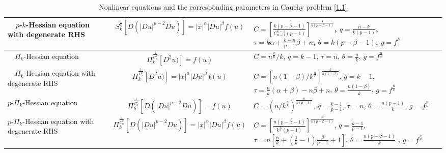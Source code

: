 \documentclass[a4paper,11pt]{amsart}
\theoremstyle{plain}
\theoremstyle{remark}
\numberwithin{equation}{section}
\numberwithin{figure}{section}
\numberwithin{remark}{section}
\begin{document}
\begin{sloppypar}
\begin{table}[!htp]
{\begin{tabular}{|m{3.8cm}|c|m{5cm}|}
         \ \ $p$-$k$-Hessian equation with degenerate RHS&  $S_k^{\frac{1}{k}} [D(|Du|^{p-2}Du)] = |x|^\alpha |Du|^\beta f(u)$&  $C=\left[ \frac{k(p-\beta-1)}{C_{n-1}^{k-1}(p-1)} \right]^{\frac{1}{k(p-\beta-1)}}$, \newline $q=\frac{n-k}{k(p-1)}$, $\tau =k\alpha+\frac{k-n}{p-1}\beta+n$, $\theta =k(p-\beta-1)$, $g=f^k$\\\hline
        
         \ \ $\Pi_k$-Hessian equation&  $\Pi_k^{\frac{1}{C_n^k}} [D^2u)] = f(u)$&  $C=n^{\frac{k}{n}}/ k$, $q=k-1$, $\tau =n$, $\theta=\frac{n}{k}$,  $g=f^{\frac{n}{k}}$\\\hline  
        
         \ \ $\Pi_k$-Hessian equation with degenerate RHS& $\Pi_k^{\frac{1}{C_n^k}} [D^2u)] = |x|^\alpha |Du|^\beta f(u)$&   $C=\left[ n(1-\beta) / k^{\frac{n}{k}}\right]^{\frac{k}{n(1-\beta)}}$, \newline  $q=k-1$, \newline $\tau =\frac{n}{k}(\alpha+\beta)-n\beta+n$, \newline $\theta = \frac{n(1-\beta)}{k}$, $g=f^{\frac{n}{k}}$\\\hline
         
         $p$-$\Pi_k$-Hessian equation& $\Pi_k^{\frac{1}{C_n^k}} [D(|Du|^{p-2}Du)] = f(u)$& $C=(n/ k^{\frac{n}{k}})^{\frac{n}{k(p-1)}}$, $q=\frac{k-1}{p-1}$, $\tau =n$, $\theta=\frac{n(p-1)}{k}$, $g=f^{\frac{n}{k}}$\\\hline
         
         $p$-$\Pi_k$-Hessian equation with degenerate RHS& $\Pi_k^{\frac{1}{C_n^k}} [D(|Du|^{p-2}Du)] = |x|^\alpha |Du|^\beta f(u)$& $C=\left [\frac{n(p-\beta-1)}{k^{\frac{n}{k}}(p-1)} \right ]^{\frac{n}{k(p-\beta-1)}}$, \newline $q=\frac{k-1}{p-1}$, \newline $\tau =n\left[\frac{\alpha}{k}+(\frac{1}{k}-1)\frac{\beta}{p-1} +1\right]$, \newline $\theta=\frac{n(p-\beta-1)}{k}$ , $g=f^{\frac{n}{k}}$\\\hline
   \end{tabular}
   
   }
   \vspace{2mm}
   
\caption{Nonlinear equations and the corresponding parameters in Cauchy problem \eqref{1.1}}\label{Table1}
\end{table}





\end{sloppypar}
\end{document}
